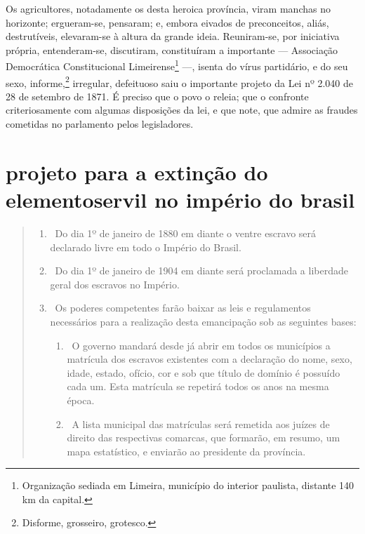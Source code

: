 {
Os agricultores, notadamente os desta heroica província, viram manchas
no horizonte; ergueram-se, pensaram; e, embora eivados de preconceitos,
aliás, destrutíveis, elevaram-se à altura da grande ideia. Reuniram-se,
por iniciativa própria, entenderam-se, discutiram, constituíram a
importante --- Associação Democrática Constitucional
Limeirense\footnote{Organização sediada em Limeira, município do
  interior paulista, distante 140 km da capital.} ---, isenta do vírus
partidário, e do seu sexo, informe,\footnote{Disforme, grosseiro,
  grotesco.} irregular, defeituoso saiu o importante projeto da Lei nº
2.040 de 28 de setembro de 1871. É preciso que o povo o releia; que o
confronte criteriosamente com algumas disposições da lei, e que note,
que admire as fraudes cometidas no parlamento pelos legisladores.

\section*{projeto para a extinção do elemento\break servil no império do brasil}

\begin{quote}
\begin{enumerate}[label=Art. \arabic*º]
\item\ Do dia 1º de janeiro de 1880 em diante o ventre escravo será
declarado livre em todo o Império do Brasil.

\item\ Do dia 1º de janeiro de 1904 em diante será proclamada a
liberdade geral dos escravos no Império.

\item\ Os poderes competentes farão baixar as leis e regulamentos
necessários para a realização desta emancipação sob as seguintes
bases:

\begin{enumerate}[label=§ \arabic*º]
\item\ O governo mandará desde já abrir em todos os municípios a
matrícula dos escravos existentes com a declaração do nome, sexo, idade,
estado, ofício, cor e sob que título de domínio é possuído cada um. Esta
matrícula se repetirá todos os anos na mesma época.

\item\ A lista municipal das matrículas será remetida aos juízes de
direito das respectivas comarcas, que formarão, em resumo, um mapa
estatístico, e enviarão ao presidente da província.


\end{enumerate}
\end{enumerate}
\end{quote}}
